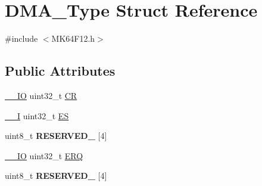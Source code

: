 \hypertarget{structDMA__Type}{}\section{D\+M\+A\+\_\+\+Type Struct Reference}
\label{structDMA__Type}


{\ttfamily \#include $<$M\+K64\+F12.\+h$>$}

\subsection*{Public Attributes}
\begin{DoxyCompactItemize}
\item 
\hyperlink{core__sc300_8h_aec43007d9998a0a0e01faede4133d6be}{\+\_\+\+\_\+\+IO} uint32\+\_\+t \hyperlink{structDMA__Type_a664cf4b368fc388926bd0e6d6822248f}{CR}
\item 
\hyperlink{core__sc300_8h_af63697ed9952cc71e1225efe205f6cd3}{\+\_\+\+\_\+I} uint32\+\_\+t \hyperlink{structDMA__Type_abaffcb82be7f60e866d66565340dc515}{ES}
\item 
uint8\+\_\+t {\bfseries R\+E\+S\+E\+R\+V\+E\+D\+\_} \mbox{[}4\mbox{]}\hypertarget{structDMA__Type_ad9c584ebbcfee6f8aa229df75b0deddb}{}\label{structDMA__Type_ad9c584ebbcfee6f8aa229df75b0deddb}

\item 
\hyperlink{core__sc300_8h_aec43007d9998a0a0e01faede4133d6be}{\+\_\+\+\_\+\+IO} uint32\+\_\+t \hyperlink{structDMA__Type_a238b1b4eca36a89065db2194e939b150}{E\+RQ}
\item 
uint8\+\_\+t {\bfseries R\+E\+S\+E\+R\+V\+E\+D\+\_} \mbox{[}4\mbox{]}\hypertarget{structDMA__Type_aae05ff6d0c9d0f238cf3a88fcf386b71}{}\label{structDMA__Type_aae05ff6d0c9d0f238cf3a88fcf386b71}


\end{DoxyCompactItemize}
